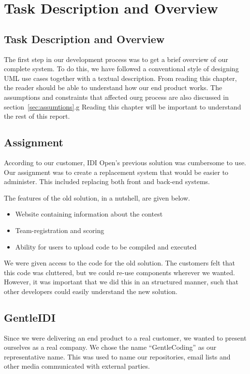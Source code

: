 \chapter{Task Description and Overview}

\section{Task Description and Overview}
\label{sec:taskdesc}

The first step in our development process was to get a brief overview of
our complete system. To do this, we have followed a conventional style
of designing UML use cases together with a textual description. From
reading this chapter, the reader should be able to understand how our
end product works. The assumptions and constraints that affected ourg
process are also discussed in section~\ref{sec:assumtions}.g
Reading this chapter will be important to
understand the rest of this report.

\section{Assignment}
According to our customer, IDI Open's previous solution was
cumbersome to use. Our assignment was to create a replacement system
that would be easier to administer.
This included replacing both front and back-end systems.

The features of the old solution, in a nutshell, are given below.
\begin{itemize}
\item Website containing information about the contest
\item Team-registration and scoring
\item Ability for users to upload code to be compiled and executed
\end{itemize}

We were given access to the code for the old solution. The customers
felt that this code was cluttered, but we could re-use components
wherever we wanted. However, it was important that we did this in an
structured manner, such that other developers could easily understand the
new solution.

\section{GentleIDI}

Since we were delivering an end product to a real customer, we wanted to
present ourselves as a real company. We chose the name
``GentleCoding'' as our
representative name. This was used to name our repositories, email
lists and other media communicated with external parties.

